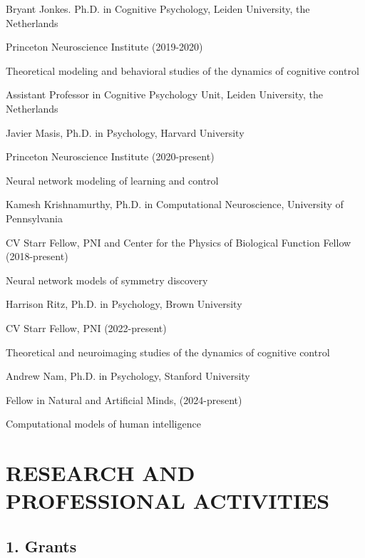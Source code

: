 \documentclass[10 pt]{article}
\begin{document}
Bryant Jonkes. Ph.D. in Cognitive Psychology, Leiden University, the Netherlands

Princeton Neuroscience Institute (2019-2020)

Theoretical modeling and behavioral studies of the dynamics of cognitive control

Assistant Professor in Cognitive Psychology Unit, Leiden University, the Netherlands
    \medskip


Javier Masis, Ph.D. in Psychology, Harvard University

Princeton Neuroscience Institute (2020-present)


Neural network modeling of learning and control
    \medskip

Kamesh Krishnamurthy, Ph.D. in Computational Neuroscience, University of Pennsylvania

CV Starr Fellow, PNI and Center for the Physics of Biological Function Fellow (2018-present)

Neural network models of symmetry discovery
    \medskip

Harrison Ritz, Ph.D. in Psychology, Brown University

CV Starr Fellow, PNI (2022-present)

Theoretical and neuroimaging studies of the dynamics of cognitive control
    \medskip

Andrew Nam, Ph.D. in Psychology, Stanford University

Fellow in Natural and Artificial Minds, (2024-present)

Computational models of human intelligence
    \medskip


\section*{RESEARCH AND PROFESSIONAL ACTIVITIES} \label{secRAPA}

\subsection*{1. Grants} \label{secRAPA1}
\end{document}
